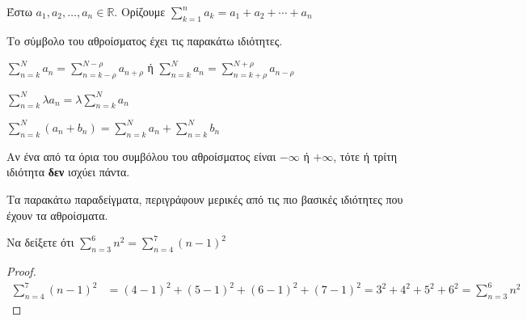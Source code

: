 




\pagestyle{vangelis}





\begin{center}
  \minibox{\large\bfseries\textcolor{Col1}{Αθροίσματα}}
\end{center}

\vspace{\baselineskip}

\begin{mybox1}
\begin{dfn}
Έστω $ a_{1}, a_{2}, \ldots, a_{n} \in \mathbb{R} $. Ορίζουμε 
$ \sum\limits_{k=1}^{n} a_{k} = a_{1} + a_{2} + \cdots + a_{n} $
\end{dfn}
\end{mybox1}

Το σύμβολο του αθροίσματος έχει τις παρακάτω ιδιότητες.
{
  \everymath{\displaystyle}
  \begin{myitemize}
    \item $ \sum_{n=k}^{N} a_{n} = \sum_{n=k- \rho }^{N- \rho } a_{n+ \rho} $ ή  
      $ \sum_{n=k}^{N} a_{n} = \sum_{n=k+ \rho }^{N+ \rho } a_{n- \rho} $
    \item $ \sum_{n=k}^{N} \lambda a_{n} = \lambda \sum_{n=k}^{N} a_{n} $ 
    \item $ \sum_{n=k}^{N} (a_{n}+b_{n}) = \sum_{n=k}^{N} a_{n} + \sum_{n=k}^{N} b_{n} $ 
  \end{myitemize}
}

\begin{rem}
  Αν ένα από τα όρια του συμβόλου του αθροίσματος είναι $ - \infty $ ή $ + \infty $, 
  τότε ή τρίτη ιδιότητα \textbf{δεν} ισχύει πάντα.
\end{rem}

Τα παρακάτω παραδείγματα, περιγράφουν μερικές από τις πιο βασικές ιδιότητες που 
έχουν τα αθροίσματα.

\begin{example}
  Να δείξετε ότι $ \sum_{n=3}^{6} n^{2} = \sum_{n=4}^{7} (n-1)^{2}   $
\end{example}
\begin{proof}
  \begin{align*}
    \sum_{n=4}^{7} (n-1)^{2} &= (4-1)^{2}+(5-1)^{2}+(6-1)^{2}+(7-1)^{2} 
    = 3^{2}+4^{2}+5^{2}+6^{2} = \sum_{n=3}^{6} n^{2} 
  \end{align*}
\end{proof}

